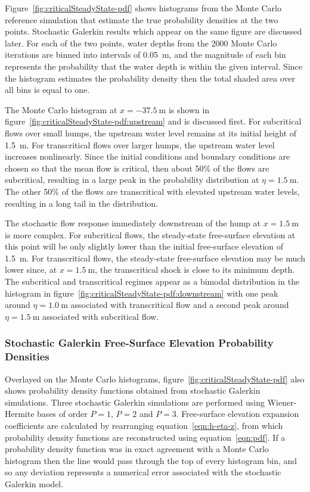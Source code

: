 Figure~\ref{fig:criticalSteadyState-pdf} shows histograms from the Monte Carlo reference simulation that estimate the true probability densities at the two points.
Stochastic Galerkin results which appear on the same figure are discussed later.
For each of the two points, water depths from the 2000 Monte Carlo iterations are binned into intervals of \SI{0.05}{\meter}, and the magnitude of each bin represents the probability that the water depth is within the given interval.
Since the histogram estimates the probability density then the total shaded area over all bins is equal to one.

The Monte Carlo histogram at $x = \SI{-37.5}{\meter}$ is shown in figure~\ref{fig:criticalSteadyState-pdf:upstream} and is discussed first.
For subcritical flows over small humps, the upstream water level remains at its initial height of \SI{1.5}{\meter}.
For transcritical flows over larger humps, the upstream water level increases nonlinearly.
Since the initial conditions and boundary conditions are chosen so that the mean flow is critical, then about 50\% of the flows are subcritical, resulting in a large peak in the
probability distribution at $\eta = \SI{1.5}{\meter}$.
The other 50\% of the flows are transcritical with elevated upstream water levels, resulting in a long tail in the distribution.

The stochastic flow response immediately downstream of the hump at $x = \SI{1.5}{\meter}$ is more complex.
For subcritical flows, the steady-state free-surface elevation at this point will be only slightly lower than the initial free-surface elevation of \SI{1.5}{\meter}.
For transcritical flows, the steady-state free-surface elevation may be much lower since,  at $x = \SI{1.5}{\meter}$, the transcritical shock is close to its minimum depth.
The subcritical and transcritical regimes appear as a bimodal distribution in the histogram in figure~\ref{fig:criticalSteadyState-pdf:downstream} with one peak around $\eta = \SI{1.0}{\meter}$ associated with transcritical flow and a second peak around $\eta = \SI{1.5}{\meter}$ associated with subcritical flow.

\subsubsection{Stochastic Galerkin Free-Surface Elevation Probability Densities}
Overlayed on the Monte Carlo histograms, figure~\ref{fig:criticalSteadyState-pdf} also shows probability density functions obtained from stochastic Galerkin simulations.
Three stochastic Galerkin simulations are performed using Wiener-Hermite bases of order $P=1$, $P=2$ and $P=3$.
Free-surface elevation expansion coefficients are calculated by rearranging equation~\eqref{eqn:h-eta-z}, from which probability density functions are reconstructed using equation~\eqref{eqn:pdf}.
If a probability density function was in exact agreement with a Monte Carlo histogram then the line would pass through the top of every histogram bin, and so any deviation represents a numerical error associated with the stochastic Galerkin model.

